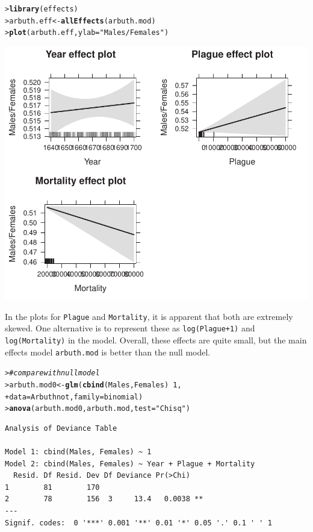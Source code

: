 \documentclass[10pt]{report}\usepackage[]{graphicx}\usepackage[]{color}
\makeatletter
\newcommand{\hlnum}[1]{\textcolor[rgb]{0.686,0.059,0.569}{#1}}%
\newcommand{\hlstr}[1]{\textcolor[rgb]{0.192,0.494,0.8}{#1}}%
\newcommand{\hlcom}[1]{\textcolor[rgb]{0.678,0.584,0.686}{\textit{#1}}}%
\newcommand{\hlopt}[1]{\textcolor[rgb]{0,0,0}{#1}}%
\newcommand{\hlstd}[1]{\textcolor[rgb]{0.345,0.345,0.345}{#1}}%
\newcommand{\hlkwb}[1]{\textcolor[rgb]{0.69,0.353,0.396}{#1}}%
\newcommand{\hlkwc}[1]{\textcolor[rgb]{0.333,0.667,0.333}{#1}}%
\newcommand{\hlkwd}[1]{\textcolor[rgb]{0.737,0.353,0.396}{\textbf{#1}}}%
\newenvironment{kframe}{%
 \def\at@end@of@kframe{}%
 \ifinner\ifhmode%
  \def\at@end@of@kframe{\end{minipage}}%
  \begin{minipage}{\columnwidth}%
 \fi\fi%
 \def\FrameCommand##1{\hskip\@totalleftmargin \hskip-\fboxsep
 \colorbox{shadecolor}{##1}\hskip-\fboxsep
     \hskip-\linewidth \hskip-\@totalleftmargin \hskip\columnwidth}%
 \MakeFramed {\advance\hsize-\width
   \@totalleftmargin\z@ \linewidth\hsize
   \@setminipage}}%
 {\par\unskip\endMakeFramed%
 \at@end@of@kframe}
\newenvironment{knitrout}{}{} %
\renewenvironment{knitrout}{\small\renewcommand{\baselinestretch}{.85}}{} %
\makeatother
\begin{document}
\begin{Exercises}
\begin{ans}
\begin{knitrout}\footnotesize
{}\color{fgcolor}\begin{kframe}
\begin{alltt}
\hlstd{> }\hlkwd{library}\hlstd{(effects)}
\hlstd{> }\hlstd{arbuth.eff} \hlkwb{<-} \hlkwd{allEffects}\hlstd{(arbuth.mod)}
\hlstd{> }\hlkwd{plot}\hlstd{(arbuth.eff,} \hlkwc{ylab}\hlstd{=}\hlstr{"Males/Females"}\hlstd{)}
\end{alltt}
\end{kframe}

\centerline{\includegraphics[width=.5\textwidth]{soln/fig/ex7_1b-1} }



\end{knitrout}
    In the plots for \texttt{Plague} and \texttt{Mortality}, it is apparent that both are extremely
    skewed.  One alternative is to represent these as \texttt{log(Plague+1)} and
    \texttt{log(Mortality)} in the model.  Overall, these effects are quite small, 
    but the main effects model \texttt{arbuth.mod} is better than the null model.
    
\begin{knitrout}\footnotesize
{}\color{fgcolor}\begin{kframe}
\begin{alltt}
\hlstd{> }  \hlcom{# compare with null model}
\hlstd{> }\hlstd{arbuth.mod0} \hlkwb{<-} \hlkwd{glm}\hlstd{(}\hlkwd{cbind}\hlstd{(Males, Females)} \hlopt{~} \hlnum{1}\hlstd{,}
\hlstd{+ }                   \hlkwc{data}\hlstd{=Arbuthnot,} \hlkwc{family}\hlstd{=binomial)}
\hlstd{> }\hlkwd{anova}\hlstd{(arbuth.mod0, arbuth.mod,} \hlkwc{test}\hlstd{=}\hlstr{"Chisq"}\hlstd{)}
\end{alltt}
\begin{verbatim}
Analysis of Deviance Table

Model 1: cbind(Males, Females) ~ 1
Model 2: cbind(Males, Females) ~ Year + Plague + Mortality
  Resid. Df Resid. Dev Df Deviance Pr(>Chi)   
1        81        170                        
2        78        156  3     13.4   0.0038 **
---
Signif. codes:  0 '***' 0.001 '**' 0.01 '*' 0.05 '.' 0.1 ' ' 1
\end{verbatim}
\end{kframe}
\end{knitrout}
	\end{ans}


\end{Exercises}
\end{document}
